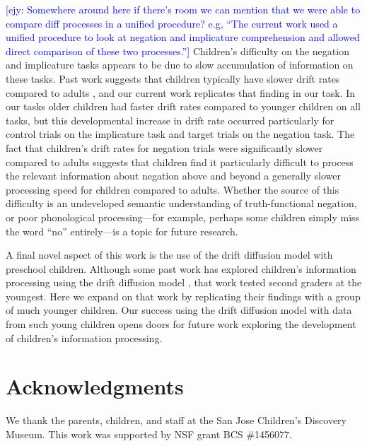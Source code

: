 \documentclass[10pt,letterpaper]{article}
\newcommand{\ejy}[1]{\textcolor{Blue}{[ejy: #1]}}
\begin{document}
\ejy{Somewhere around here if there's room we can mention that we were able to compare diff processes in a unified procedure? e.g, ``The current work used a unified procedure to look at negation and implicature comprehension and allowed direct comparison of these two processes.''}
Children's difficulty on the negation and implicature tasks appears to be due to slow accumulation of information on these tasks. Past work suggests that children typically have slower drift rates compared to adults \cite{ratcliff2012}, and our current work replicates that finding in our task. In our tasks older children had faster drift rates compared to younger children on all tasks, but this developmental increase in drift rate occurred particularly for control trials on the implicature task and target trials on the negation task. The fact that children's drift rates for negation trials were significantly slower compared to adults suggests that children find it particularly difficult to process the relevant information about negation above and beyond a generally slower processing speed for children compared to adults. Whether the source of this difficulty is an undeveloped semantic understanding of truth-functional negation, or poor phonological processing---for example, perhaps some children simply miss the word ``no'' entirely---is a topic for future research.

A final novel aspect of this work is the use of the drift diffusion model with preschool children. Although some past work has explored children's information processing using the drift diffusion model \cite{ratcliff2012}, that work tested second graders at the youngest. Here we expand on that work by replicating their findings with a group of much younger children. Our success using the drift diffusion model with data from such young children opens doors for future work exploring the development of children's information processing.

\section{Acknowledgments}
%
We thank the parents, children, and staff at the San Jose Children's Discovery Museum. This work was supported by NSF grant BCS \#1456077.




\setlength{\bibleftmargin}{.125in}
\setlength{\bibindent}{-\bibleftmargin}


\end{document}
